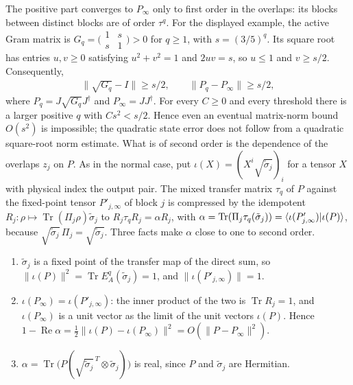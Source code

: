 \documentclass{article}
\begin{document}
The positive part converges to $P_\infty$ only to first order in the overlaps: its blocks
between distinct blocks are of order $\tau^q$. For the displayed example, the active Gram matrix is
$G_q=\bigl(\begin{smallmatrix}1&s\\s&1\end{smallmatrix}\bigr)>0$ for $q\ge1$,
with $s=(3/5)^q$. Its square root has entries $u,v\ge0$ satisfying
$u^2+v^2=1$ and $2uv=s$, so $u\le1$ and $v\ge s/2$. Consequently,
\begin{align}
    \lVert\sqrt{G_q}-I\rVert\ge s/2,\qquad
    \lVert P_q-P_\infty\rVert\ge s/2,
    \label{eq:mswc24_polar_first_order_lower_bound}
\end{align}
where $P_q=J\sqrt{G_q}J^\dagger$ and $P_\infty=JJ^\dagger$.
For every $C\ge0$ and every threshold there is a larger positive $q$ with
$Cs^2<s/2$. Hence even an eventual matrix-norm bound $O(s^2)$ is impossible;
the quadratic state error does not follow from a quadratic square-root norm estimate.
What is of second order is the dependence of the overlaps $z_j$ on $P$.
As in the normal case, put $\iota(X)=(X^i\sqrt{\tilde\sigma_j})_i$
for a tensor $X$ with physical index the output pair. The mixed transfer matrix $\tau_q$ of $P$
against the fixed-point tensor $P'_{j,\infty}$ of block $j$ is compressed by the idempotent
$R_j:\rho\mapsto\operatorname{Tr}(\Pi_j\rho)\tilde\sigma_j$ to $R_j\tau_qR_j=\alpha R_j$, with
$\alpha=\operatorname{Tr}(\Pi_j\tau_q(\tilde\sigma_j))=\langle \iota(P'_{j,\infty}) | \iota(P) \rangle$, because
$\sqrt{\tilde\sigma_j}\,\Pi_j=\sqrt{\tilde\sigma_j}$. Three facts make $\alpha$ close to one to second
order.
\begin{enumerate}
    \item $\tilde\sigma_j$ is a fixed point of the transfer map of the direct sum, so
          $\lVert\iota(P)\rVert^2=\operatorname{Tr}E_A^q(\tilde\sigma_j)=1$, and
          $\lVert\iota(P'_{j,\infty})\rVert=1$.
    \item $\iota(P_\infty)=\iota(P'_{j,\infty})$: the inner product of the two is
          $\operatorname{Tr}R_j=1$, and $\iota(P_\infty)$ is a unit vector as the limit of the unit
          vectors $\iota(P)$. Hence
          $1-\operatorname{Re}\alpha=\tfrac12\lVert\iota(P)-\iota(P_\infty)\rVert^2
              =O(\lVert P-P_\infty\rVert^2)$.
    \item $\alpha=\operatorname{Tr}\bigl(P(\sqrt{\tilde\sigma_j}^{\,T}\otimes\tilde\sigma_j)\bigr)$ is real,
          since $P$ and $\tilde\sigma_j$ are Hermitian.
\end{enumerate}
\end{document}
